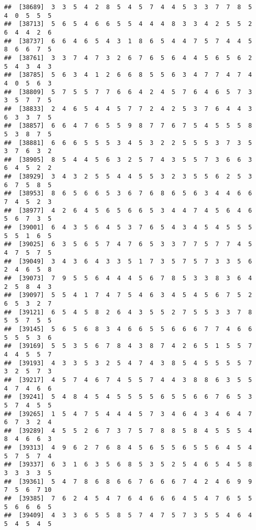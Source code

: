 \documentclass[
]{book}
\begin{document}
\begin{verbatim}
##  [38689]  3  3  5  4  2  8  5  4  5  7  4  4  5  3  3  7  7  8  5  4  0  5  5  5
##  [38713]  5  6  5  4  6  6  5  5  4  4  4  8  3  3  4  2  5  5  2  6  4  4  2  6
##  [38737]  6  6  4  6  5  4  3  1  8  6  5  4  4  7  5  7  4  4  5  8  6  6  7  5
##  [38761]  3  3  7  4  7  3  2  6  7  6  5  6  4  4  5  6  5  6  2  5  4  3  4  3
##  [38785]  5  6  3  4  1  2  6  6  8  5  5  6  3  4  7  7  4  7  4  4  0  5  6  3
##  [38809]  5  7  5  5  7  7  6  6  4  2  4  5  7  6  4  6  5  7  3  3  5  7  7  5
##  [38833]  2  4  6  5  4  4  5  7  7  2  4  2  5  3  7  6  4  4  3  6  3  3  7  5
##  [38857]  6  6  4  7  6  5  5  9  8  7  7  6  7  5  4  5  5  5  8  5  3  8  7  5
##  [38881]  6  6  6  5  5  5  3  4  5  3  2  2  5  5  5  3  7  3  5  3  7  6  3  2
##  [38905]  8  5  4  4  5  6  3  2  5  7  4  3  5  5  7  3  6  6  3  6  4  5  2  2
##  [38929]  3  4  3  2  5  5  4  4  5  5  3  2  3  5  5  6  2  5  3  6  7  5  8  5
##  [38953]  8  6  5  6  6  5  3  6  7  6  8  6  5  6  3  4  4  6  6  7  4  5  2  3
##  [38977]  4  2  6  4  5  6  5  6  6  5  3  4  4  7  4  5  6  4  6  5  6  7  3  5
##  [39001]  6  4  3  5  6  4  5  3  7  6  5  4  3  4  5  4  5  5  5  5  5  1  6  5
##  [39025]  6  3  5  6  5  7  4  7  6  5  3  3  7  7  5  7  7  4  5  4  7  5  7  5
##  [39049]  3  4  3  6  4  3  3  5  1  7  3  5  7  5  7  3  3  5  6  2  4  6  5  8
##  [39073]  7  9  5  5  6  4  4  4  5  6  7  8  5  3  3  8  3  6  4  2  5  8  4  3
##  [39097]  5  5  4  1  7  4  7  5  4  6  3  4  5  4  5  6  7  5  2  6  5  3  2  7
##  [39121]  6  5  4  5  8  2  6  4  3  5  5  2  7  5  5  3  3  7  8  5  5  7  5  5
##  [39145]  5  6  5  6  8  3  4  6  6  5  5  6  6  6  7  7  4  6  6  5  5  5  3  6
##  [39169]  5  5  3  5  6  7  8  4  3  8  7  4  2  6  5  1  5  5  7  4  4  5  5  7
##  [39193]  4  3  3  5  3  2  5  4  7  4  3  8  5  4  5  5  5  5  7  3  2  5  7  3
##  [39217]  4  5  7  4  6  7  4  5  5  7  4  4  3  8  8  6  3  5  5  4  7  4  6  6
##  [39241]  5  4  8  4  5  4  5  5  5  5  6  5  5  6  6  7  6  5  3  5  7  4  5  5
##  [39265]  1  5  4  7  5  4  4  4  5  7  3  4  6  4  3  4  6  4  7  6  7  3  2  4
##  [39289]  4  5  5  2  6  7  3  7  5  7  8  8  5  8  4  5  5  5  4  8  4  6  6  3
##  [39313]  4  9  6  2  7  6  8  4  5  6  5  5  6  5  5  6  4  5  4  5  7  5  7  4
##  [39337]  6  3  1  6  3  5  6  8  5  3  5  2  5  4  6  5  4  5  8  3  3  3  3  5
##  [39361]  5  4  7  8  6  8  6  6  7  6  6  6  7  4  2  4  6  9  9  7  5  6  7 10
##  [39385]  7  6  2  4  5  4  7  6  4  6  6  6  4  5  4  7  6  5  5  5  6  6  6  5
##  [39409]  4  3  3  6  5  5  8  5  7  4  7  5  7  3  5  5  4  6  4  5  4  5  4  5

\end{verbatim}
\end{document}
